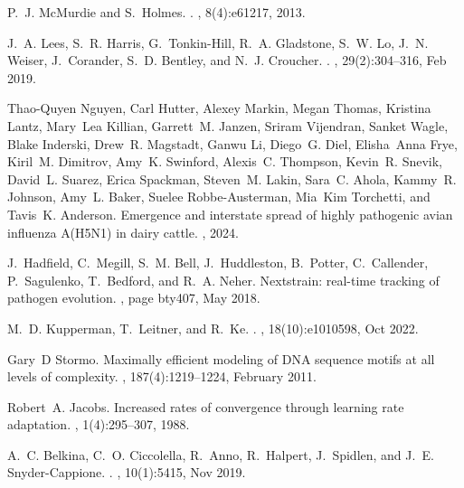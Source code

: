 \documentclass[webpdf,contemporary,large,single]{oup-authoring-template}%
\theoremstyle{thmstyleone}%
\theoremstyle{thmstyletwo}%
\theoremstyle{thmstylethree}%
\begin{document}
\begin{thebibliography}{10}
P.~J. McMurdie and S.~Holmes.
.
, 8(4):e61217, 2013.

J.~A. Lees, S.~R. Harris, G.~Tonkin-Hill, R.~A. Gladstone, S.~W. Lo, J.~N.
  Weiser, J.~Corander, S.~D. Bentley, and N.~J. Croucher.
.
, 29(2):304--316, Feb 2019.

Thao-Quyen Nguyen, Carl Hutter, Alexey Markin, Megan Thomas, Kristina Lantz,
  Mary~Lea Killian, Garrett~M. Janzen, Sriram Vijendran, Sanket Wagle, Blake
  Inderski, Drew~R. Magstadt, Ganwu Li, Diego~G. Diel, Elisha~Anna Frye,
  Kiril~M. Dimitrov, Amy~K. Swinford, Alexis~C. Thompson, Kevin~R. Snevik,
  David~L. Suarez, Erica Spackman, Steven~M. Lakin, Sara~C. Ahola, Kammy~R.
  Johnson, Amy~L. Baker, Suelee Robbe-Austerman, Mia~Kim Torchetti, and
  Tavis~K. Anderson.
\newblock Emergence and interstate spread of highly pathogenic avian influenza
  {A(H5N1)} in dairy cattle.
, 2024.

J.~Hadfield, C.~Megill, S.~M. Bell, J.~Huddleston, B.~Potter, C.~Callender,
  P.~Sagulenko, T.~Bedford, and R.~A. Neher.
\newblock Nextstrain: real-time tracking of pathogen evolution.
, page bty407, May 2018.

M.~D. Kupperman, T.~Leitner, and R.~Ke.
.
, 18(10):e1010598, Oct 2022.

Gary~D Stormo.
\newblock Maximally efficient modeling of {DNA} sequence motifs at all levels
  of complexity.
, 187(4):1219--1224, February 2011.

Robert~A. Jacobs.
\newblock Increased rates of convergence through learning rate adaptation.
, 1(4):295--307, 1988.

A.~C. Belkina, C.~O. Ciccolella, R.~Anno, R.~Halpert, J.~Spidlen, and J.~E.
  Snyder-Cappione.
.
, 10(1):5415, Nov 2019.


\end{thebibliography}
\end{document}
